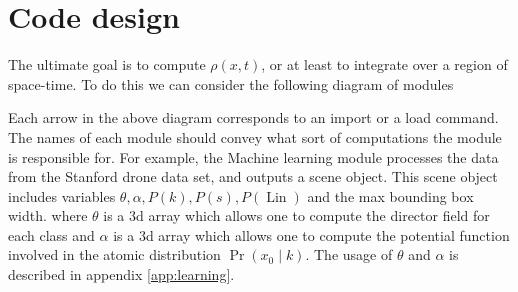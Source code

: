 \documentclass[12pt]{amsart}
\DeclareMathOperator{\Lin}{Lin}
\begin{document}
\section{Code design}

The ultimate goal is to compute $\rho(x,t)$, or at least to integrate over a region of space-time.
To do this we can consider the following diagram of modules


Each arrow in the above diagram corresponds to an import or a load command.
The names of each module should convey what sort of computations the module is responsible for.
For example, the Machine learning module processes the data from the Stanford drone data set, and outputs a scene object.
This scene object includes variables $\theta, \alpha, P(k), P(s), P(\Lin)$ and the max bounding box width.
where $\theta$ is a 3d array which allows one to compute the director field for each class
and $\alpha$ is a 3d array which allows one to compute the potential function involved in the atomic distribution $\Pr( x_0 \mid k)$.
The usage of $\theta$ and $\alpha$ is described in appendix \ref{app:learning}.
\end{document}
